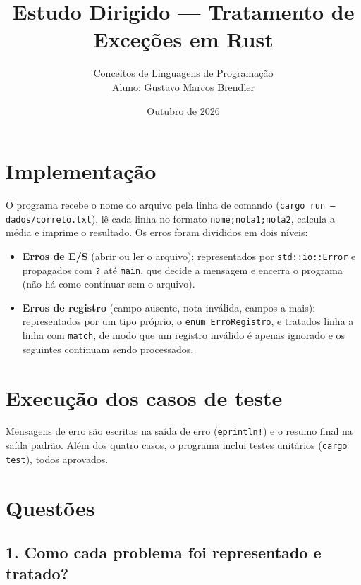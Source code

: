 \documentclass[11pt,a4paper]{article}
\title{Estudo Dirigido --- Tratamento de Exceções em Rust}
\author{Conceitos de Linguagens de Programação\\[2pt]
  \small Aluno: Gustavo Marcos Brendler}
\date{Outubro de 2026}
\newcommand{\code}[1]{\texttt{#1}}
\begin{document}
\sloppy
\maketitle

\section{Implementação}

O programa recebe o nome do arquivo pela linha de comando
(\code{cargo run -- dados/correto.txt}), lê cada linha no formato
\code{nome;nota1;nota2}, calcula a média e imprime o resultado.
Os erros foram divididos em dois níveis:

\begin{itemize}
  \item \textbf{Erros de E/S} (abrir ou ler o arquivo): representados por
    \code{std::io::Error} e propagados com \code{?} até \code{main}, que decide
    a mensagem e encerra o programa (não há como continuar sem o arquivo).
  \item \textbf{Erros de registro} (campo ausente, nota inválida, campos a mais):
    representados por um tipo próprio, o \code{enum ErroRegistro}, e tratados
    linha a linha com \code{match}, de modo que um registro inválido é apenas
    ignorado e os seguintes continuam sendo processados.
\end{itemize}



\newpage
\section{Execução dos casos de teste}



Mensagens de erro são escritas na saída de erro (\code{eprintln!}) e o
resumo final na saída padrão. Além dos quatro casos, o programa inclui
testes unitários (\code{cargo test}), todos aprovados.

\section{Questões}

\subsection*{1. Como cada problema foi representado e tratado?}
\end{document}
